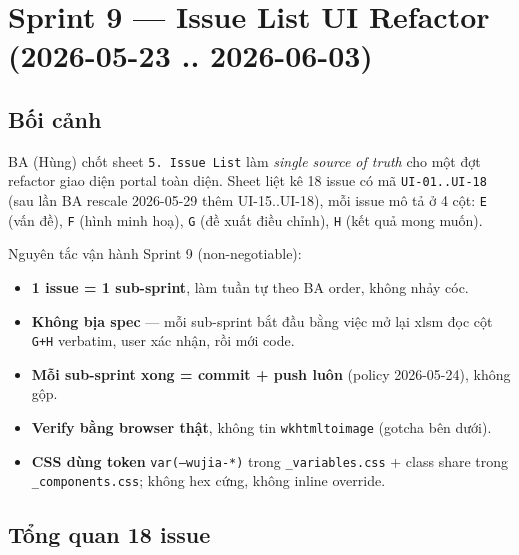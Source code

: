 \chapter{Sprint 9 --- Issue List UI Refactor (2026-05-23 .. 2026-06-03)}

\section{Bối cảnh}

BA (Hùng) chốt sheet \texttt{5. Issue List} làm \emph{single source of truth} cho
một đợt refactor giao diện portal toàn diện. Sheet liệt kê 18 issue có mã
\texttt{UI-01..UI-18} (sau lần BA rescale 2026-05-29 thêm UI-15..UI-18), mỗi
issue mô tả ở 4 cột: \texttt{E} (vấn đề), \texttt{F} (hình minh hoạ), \texttt{G}
(đề xuất điều chỉnh), \texttt{H} (kết quả mong muốn).

Nguyên tắc vận hành Sprint 9 (non-negotiable):

\begin{itemize}[leftmargin=*]
    \item \textbf{1 issue = 1 sub-sprint}, làm tuần tự theo BA order, không nhảy cóc.
    \item \textbf{Không bịa spec} --- mỗi sub-sprint bắt đầu bằng việc mở lại xlsm đọc
          cột \texttt{G+H} verbatim, user xác nhận, rồi mới code.
    \item \textbf{Mỗi sub-sprint xong = commit + push luôn} (policy 2026-05-24), không gộp.
    \item \textbf{Verify bằng browser thật}, không tin \texttt{wkhtmltoimage} (gotcha bên dưới).
    \item \textbf{CSS dùng token} \texttt{var(--wujia-*)} trong \texttt{\_variables.css} +
          class share trong \texttt{\_components.css}; không hex cứng, không inline override.
\end{itemize}

\section{Tổng quan 18 issue}

